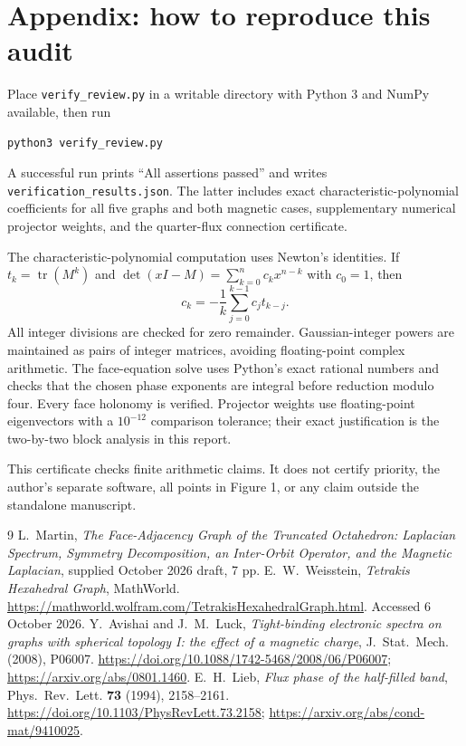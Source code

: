\documentclass[11pt,a4paper]{article}
\newcommand{\tr}{\operatorname{tr}}
\begin{document}
\appendix
\section*{Appendix: how to reproduce this audit}
Place \texttt{verify\_review.py} in a writable directory with Python 3 and NumPy available, then run
\begin{verbatim}
python3 verify_review.py
\end{verbatim}
A successful run prints ``All assertions passed'' and writes \texttt{verification\_results.json}. The latter includes exact characteristic-polynomial coefficients for all five graphs and both magnetic cases, supplementary numerical projector weights, and the quarter-flux connection certificate.

The characteristic-polynomial computation uses Newton's identities. If $t_k=\tr(M^k)$ and $\det(xI-M)=\sum_{k=0}^n c_kx^{n-k}$ with $c_0=1$, then
\[
 c_k=-\frac1k\sum_{j=0}^{k-1}c_jt_{k-j}.
\]
All integer divisions are checked for zero remainder. Gaussian-integer powers are maintained as pairs of integer matrices, avoiding floating-point complex arithmetic. The face-equation solve uses Python's exact rational numbers and checks that the chosen phase exponents are integral before reduction modulo four. Every face holonomy is verified. Projector weights use floating-point eigenvectors with a $10^{-12}$ comparison tolerance; their exact justification is the two-by-two block analysis in this report.

This certificate checks finite arithmetic claims. It does not certify priority, the author's separate software, all points in Figure 1, or any claim outside the standalone manuscript.

\begin{thebibliography}{9}
 L.~Martin, \emph{The Face-Adjacency Graph of the Truncated Octahedron: Laplacian Spectrum, Symmetry Decomposition, an Inter-Orbit Operator, and the Magnetic Laplacian}, supplied October 2026 draft, 7 pp.
 E.~W.~Weisstein, \emph{Tetrakis Hexahedral Graph}, MathWorld. \url{https://mathworld.wolfram.com/TetrakisHexahedralGraph.html}. Accessed 6 October 2026.
 Y.~Avishai and J.~M.~Luck, \emph{Tight-binding electronic spectra on graphs with spherical topology I: the effect of a magnetic charge}, J.~Stat.~Mech. (2008), P06007. \url{https://doi.org/10.1088/1742-5468/2008/06/P06007}; \url{https://arxiv.org/abs/0801.1460}.
 E.~H.~Lieb, \emph{Flux phase of the half-filled band}, Phys.~Rev.~Lett. \textbf{73} (1994), 2158--2161. \url{https://doi.org/10.1103/PhysRevLett.73.2158}; \url{https://arxiv.org/abs/cond-mat/9410025}.
\end{thebibliography}
\end{document}

